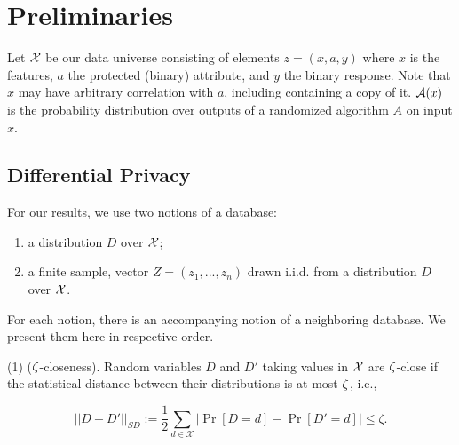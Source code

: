 \section{Preliminaries}
Let $\mathcal{X}$ be our data universe consisting of elements $z=(x,a,y)$
 where $x$ is the features, $a$ the protected (binary) attribute, and
 $y$ the binary response. Note that $x$ may have arbitrary correlation
 with $a$, including containing a copy of it. $\mathcal{A}(x)$ is the
 probability distribution over outputs of a randomized algorithm $A$ on
 input $x$.





\subsection{Differential Privacy}

For our results, we use two notions of a database:

\begin{enumerate}
	\item a distribution $D$ over $\mathcal{X}$;
	\item a finite sample, vector $Z = (z_1, ..., z_n)$ drawn i.i.d. from a distribution $D$ over $\mathcal{X}$.
\end{enumerate}
For each notion, there is an accompanying notion of a neighboring
database. We present them here in respective order.

\begin{defn}
  (1) ($\zeta$-closeness). Random variables $D$ and $D'$ taking values in
  $\mathcal{X}$ are $\zeta$-close if the statistical distance between their
  distributions is at most $\zeta$, i.e.,

	$$ ||D-D'||_{\textit{SD}} :=\frac{1}{2}\sum_{d\in \mathcal{X}}
  |\Pr[D=d] - \Pr[D'=d]| \leq \zeta.$$
\end{defn}

